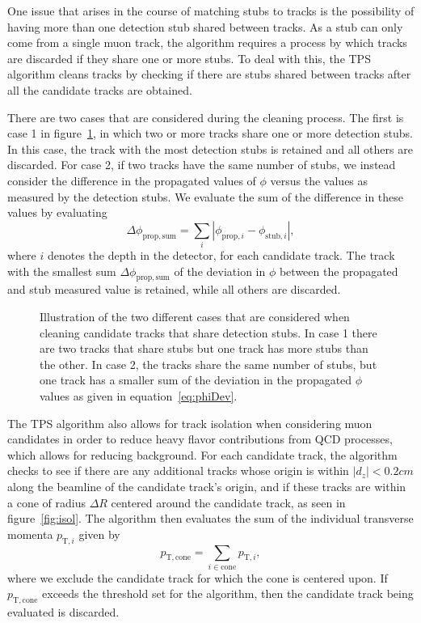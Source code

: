 One issue that arises in the course of matching stubs to tracks is the possibility of having more than one detection stub shared between tracks.
As a stub can only come from a single muon track, the algorithm requires a process by which tracks are discarded if they share one or more stubs.
To deal with this, the TPS algorithm cleans tracks by checking if there are stubs shared between tracks after all the candidate tracks are obtained.

There are two cases that are considered during the cleaning process.
The first is case 1 in figure~\ref{fig:clean}, in which two or more tracks share one or more detection stubs.
In this case, the track with the most detection stubs is retained and all others are discarded.
For case 2, if two tracks have the same number of stubs, we instead consider the difference in the propagated values of $\phi$ versus the values as measured by the detection stubs.
We evaluate the sum of the difference in these values by evaluating
\begin{equation}\label{eq:phiDev}
  \Delta\phi_{\mathrm{prop,sum}}=\sum_i|\phi_{\mathrm{prop},i}-\phi_{\mathrm{stub},i}|,
\end{equation}
where $i$ denotes the depth in the detector, for each candidate track.
The track with the smallest sum $\Delta\phi_{\mathrm{prop,sum}}$ of the deviation in $\phi$ between the propagated and stub measured value is retained, while all others are discarded.

\begin{figure}[htbp]
  \centering
  
  \caption{
    Illustration of the two different cases that are considered when cleaning candidate tracks that share detection stubs.
    In case 1 there are two tracks that share stubs but one track has more stubs than the other.
    In case 2, the tracks share the same number of stubs, but one track has a smaller sum of the deviation in the propagated $\phi$ values as given in equation~\ref{eq:phiDev}.
  }
  \label{fig:clean}
\end{figure}

The TPS algorithm also allows for track isolation when considering muon candidates in order to reduce heavy flavor contributions from QCD processes, which allows for reducing background.
For each candidate track, the algorithm checks to see if there are any additional tracks whose origin is within $|d_z|<0.2\unit{cm}$ along the beamline of the candidate track's origin, and if these tracks are within a cone of radius $\Delta R$ centered around the candidate track, as seen in figure~\ref{fig:isol}.
The algorithm then evaluates the sum of the individual transverse momenta $p_{\mathrm{T},i}$ given by
\begin{equation}\label{eq:ptCone}
  p_\mathrm{T,cone}=\sum_{i\in\mathrm{cone}}p_{\mathrm{T},i},
\end{equation}
where we exclude the candidate track for which the cone is centered upon.
If $p_\mathrm{T,cone}$ exceeds the threshold set for the algorithm, then the candidate track being evaluated is discarded.

